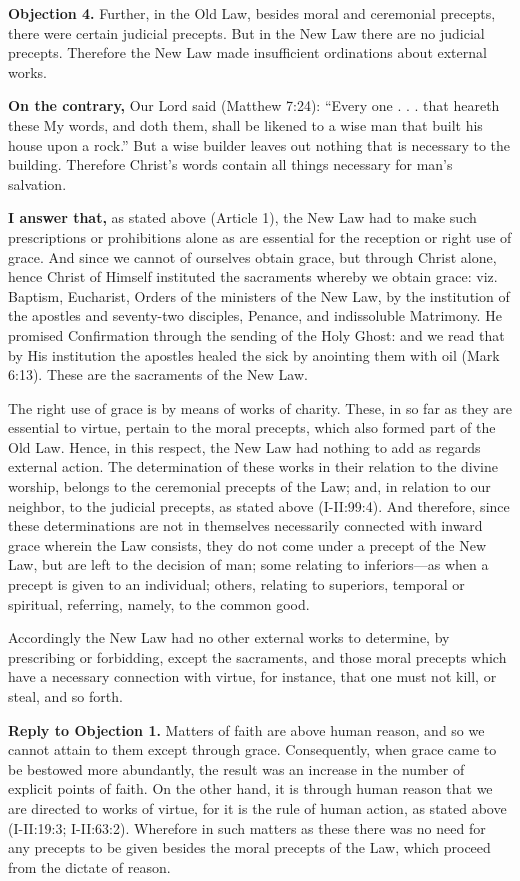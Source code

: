 \textbf{Objection 4.} Further, in the Old Law, besides moral and ceremonial precepts, there were certain judicial precepts. But in the New Law there are no judicial precepts. Therefore the New Law made insufficient ordinations about external works.

\textbf{On the contrary,} Our Lord said (Matthew 7:24): ``Every one . . . that heareth these My words, and doth them, shall be likened to a wise man that built his house upon a rock.'' But a wise builder leaves out nothing that is necessary to the building. Therefore Christ's words contain all things necessary for man's salvation.

\textbf{I answer that,} as stated above (Article 1), the New Law had to make such prescriptions or prohibitions alone as are essential for the reception or right use of grace. And since we cannot of ourselves obtain grace, but through Christ alone, hence Christ of Himself instituted the sacraments whereby we obtain grace: viz. Baptism, Eucharist, Orders of the ministers of the New Law, by the institution of the apostles and seventy-two disciples, Penance, and indissoluble Matrimony. He promised Confirmation through the sending of the Holy Ghost: and we read that by His institution the apostles healed the sick by anointing them with oil (Mark 6:13). These are the sacraments of the New Law.

The right use of grace is by means of works of charity. These, in so far as they are essential to virtue, pertain to the moral precepts, which also formed part of the Old Law. Hence, in this respect, the New Law had nothing to add as regards external action. The determination of these works in their relation to the divine worship, belongs to the ceremonial precepts of the Law; and, in relation to our neighbor, to the judicial precepts, as stated above (I-II:99:4). And therefore, since these determinations are not in themselves necessarily connected with inward grace wherein the Law consists, they do not come under a precept of the New Law, but are left to the decision of man; some relating to inferiors—as when a precept is given to an individual; others, relating to superiors, temporal or spiritual, referring, namely, to the common good.

Accordingly the New Law had no other external works to determine, by prescribing or forbidding, except the sacraments, and those moral precepts which have a necessary connection with virtue, for instance, that one must not kill, or steal, and so forth.

\textbf{Reply to Objection 1.} Matters of faith are above human reason, and so we cannot attain to them except through grace. Consequently, when grace came to be bestowed more abundantly, the result was an increase in the number of explicit points of faith. On the other hand, it is through human reason that we are directed to works of virtue, for it is the rule of human action, as stated above (I-II:19:3; I-II:63:2). Wherefore in such matters as these there was no need for any precepts to be given besides the moral precepts of the Law, which proceed from the dictate of reason.

